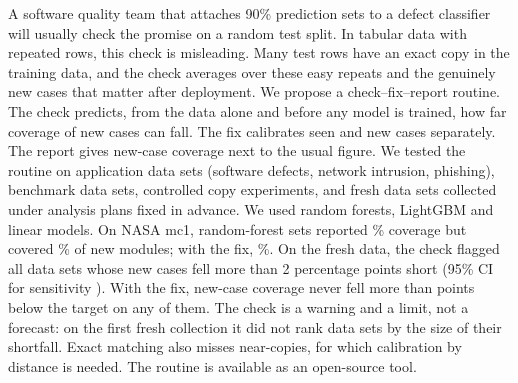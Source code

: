 A software quality team that attaches 90\% prediction sets to a defect classifier will usually check the promise on a random test split. In tabular data with repeated rows, this check is misleading. Many test rows have an exact copy in the training data, and the check averages over these easy repeats and the genuinely new cases that matter after deployment. We propose a check--fix--report routine. The check predicts, from the data alone and before any model is trained, how far coverage of new cases can fall. The fix calibrates seen and new cases separately. The report gives new-case coverage next to the usual figure. We tested the routine on \NCsNFlagTotal{} application data sets (software defects, network intrusion, phishing), \NNTotal{} benchmark data sets, controlled copy experiments, and \NScpN{} fresh data sets collected under analysis plans fixed in advance. We used random forests, LightGBM and linear models. On NASA mc1, random-forest sets reported \NCsMcOneReported{}\% coverage but covered \NCsMcOneNew{}\% of new modules; with the fix, \NCsMcOneFixed{}\%. On the fresh data, the check flagged all \NScpPos{} data sets whose new cases fell more than 2 percentage points short (95\% CI for sensitivity \NScpSensCi{}). With the fix, new-case coverage never fell more than \NWTwoWorstFixAbs{} points below the target on any of them. The check is a warning and a limit, not a forecast: on the first fresh collection it did not rank data sets by the size of their shortfall. Exact matching also misses near-copies, for which calibration by distance is needed. The routine is available as an open-source tool.
